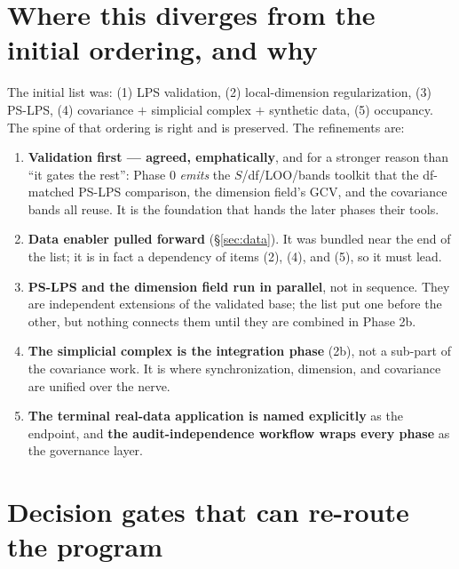 \documentclass[11pt]{article}
\begin{document}
\section{Where this diverges from the initial ordering, and why}\label{sec:diverge}

The initial list was: (1) LPS validation, (2) local-dimension regularization,
(3) PS-LPS, (4) covariance $+$ simplicial complex $+$ synthetic data, (5) occupancy.
The spine of that ordering is right and is preserved. The refinements are:

\begin{enumerate}[leftmargin=1.6em]
\item \textbf{Validation first --- agreed, emphatically}, and for a stronger reason
than ``it gates the rest'': Phase 0 \emph{emits} the $S$/df/LOO/bands toolkit that
the df-matched PS-LPS comparison, the dimension field's GCV, and the covariance
bands all reuse. It is the foundation that hands the later phases their tools.
\item \textbf{Data enabler pulled forward} (\S\ref{sec:data}). It was bundled near
the end of the list; it is in fact a dependency of items (2), (4), and (5), so it
must lead.
\item \textbf{PS-LPS and the dimension field run in parallel}, not in sequence.
They are independent extensions of the validated base; the list put one before the
other, but nothing connects them until they are combined in Phase 2b.
\item \textbf{The simplicial complex is the integration phase} (2b), not a sub-part
of the covariance work. It is where synchronization, dimension, and covariance are
unified over the nerve.
\item \textbf{The terminal real-data application is named explicitly} as the
endpoint, and \textbf{the audit-independence workflow wraps every phase} as the
governance layer.
\end{enumerate}

\section{Decision gates that can re-route the program}\label{sec:reroute}
\end{document}
